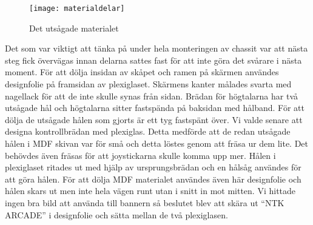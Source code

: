 \documentclass[12pt,fleqn,openany]{book} %
\begin{document}
\begin{table}[h]
\centering{}
\caption{Material som användes}
\label{table_material}
\end{table}

\begin{wrapfigure}[17]{R}{0.35\textwidth}
  \begin{center}
    \texttt{[image: materialdelar]}
  \end{center}
  \caption{Det utsågade materialet}
  \label{fig_material}
\end{wrapfigure}
\newpage
Det som var viktigt att tänka på under hela monteringen av chassit var att nästa steg fick övervägas innan delarna sattes fast 
för att inte göra det svårare i nästa moment. För att dölja insidan av skåpet och ramen på skärmen användes designfolie på framsidan 
av plexiglaset. Skärmens kanter målades svarta med nagellack för att de inte skulle synas från sidan. Brädan för högtalarna har två
utsågade hål och högtalarna sitter fastspända på baksidan med hålband. För att dölja de utsågade hålen som gjorts är ett tyg fastspänt
över. Vi valde senare att designa kontrollbrädan med plexiglas. Detta medförde att de redan utsågade hålen i MDF skivan var för små 
och detta löstes genom att fräsa ur dem lite. Det behövdes även fräsas för att joystickarna skulle komma upp mer. Hålen i plexiglaset
ritades ut med hjälp av ursprungsbrädan och en hålsåg användes för att göra hålen. För att dölja MDF materialet användes även här 
designfolie och hålen skars ut men inte hela vägen runt utan i snitt in mot mitten. Vi hittade ingen bra bild att använda till bannern 
så beslutet blev att skära ut “NTK ARCADE” i designfolie och sätta mellan de två plexiglasen.
\end{document}

